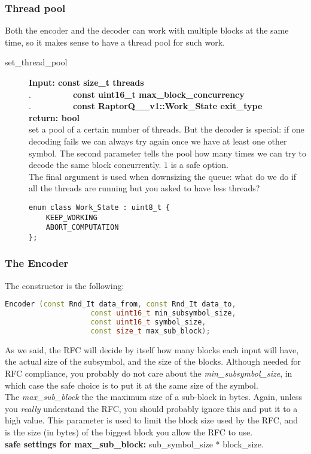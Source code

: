 \documentclass[11pt,a4paper]{refart}
\begin{document}
\newpage
\subsubsection{Thread pool}

Both the encoder and the decoder can work with multiple blocks at the same time, so it makes sense to have a thread pool for such work.

\begin{description}
\item[set\_thread\_pool] \textbf{Input: const size\_t threads}\\
.\ \ \ \ \ \ \ \ \ \ \textbf{const uint16\_t max\_block\_concurrency}\\
.\ \ \ \ \ \ \ \ \ \ \textbf{const RaptorQ\_\_v1::Work\_State exit\_type}\\
\textbf{return: bool}\\
set a pool of a certain number of threads. But the decoder is special: if one decoding fails we can always try again once we have at least one other symbol. The second parameter tells the pool how many times we can try to decode the same block concurrently. $1$ is a safe option.\\
The final argument is used when downsizing the queue: what do we do if all the threads are running but you asked to have less threads?
\begin{lstlisting}
enum class Work_State : uint8_t {
	KEEP_WORKING
	ABORT_COMPUTATION
};
\end{lstlisting}
\end{description}
\newpage
\subsubsection{The Encoder}
The constructor is the following:
\begin{lstlisting}[language=C++]
Encoder (const Rnd_It data_from, const Rnd_It data_to,
					const uint16_t min_subsymbol_size,
					const uint16_t symbol_size,
					const size_t max_sub_block);
\end{lstlisting}

As we said, the RFC will decide by itself how many blocks each input will have, the actual size of the subsymbol, and the size of the blocks. Although needed for RFC compliance, you probably do not care about the \textit{min\_subsymbol\_size}, in which case the safe choice is to put it at the same size of the symbol.\\
The \textit{max\_sub\_block} the the maximum size of a sub-block in bytes. Again, unless you \textit{really} understand the RFC, you should probably ignore this and put it to a high value. This parameter is used to limit the block size used by the RFC, and is the size (in bytes) of the biggest block you allow the RFC to use.\\
\textbf{safe settings for max\_sub\_block:} sub\_symbol\_size * block\_size.
\end{document}
